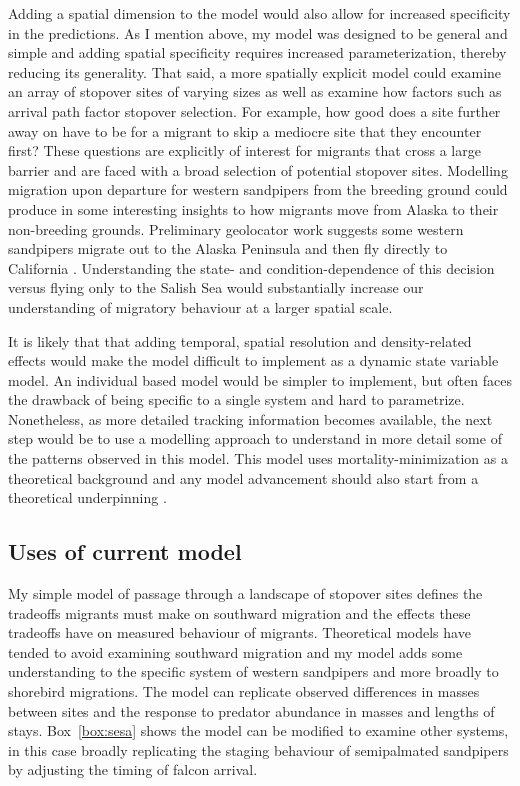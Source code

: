 Adding a spatial dimension to the model would also allow for increased specificity in the predictions. As I mention above, my model was designed to be general and simple and adding spatial specificity requires increased parameterization, thereby reducing its generality. That said, a more spatially explicit model could examine an array of stopover sites of varying sizes as well as examine how factors such as arrival path factor stopover selection. For example, how good does a site further away on have to be for a migrant to skip a mediocre site that they encounter first? These questions are explicitly of interest for migrants that cross a large barrier and are faced with a broad selection of potential stopover sites. Modelling migration upon departure for western sandpipers from the breeding ground could produce in some interesting insights to how migrants move from Alaska to their non-breeding grounds. Preliminary geolocator work suggests some western sandpipers migrate out to the Alaska Peninsula and then fly directly to California \citep{north2016state}. Understanding the state- and condition-dependence of this decision versus flying only to the Salish Sea would substantially increase our understanding of migratory behaviour at a larger spatial scale.

It is likely that that adding temporal, spatial resolution and density-related effects would make the model difficult to implement as a dynamic state variable model. An individual based model would be simpler to implement, but often faces the drawback of being specific to a single system and hard to parametrize. Nonetheless, as more detailed tracking information becomes available, the next step would be to use a modelling approach to understand in more detail some of the patterns observed in this model. This model uses mortality-minimization as a theoretical background and any model advancement should also start from a theoretical underpinning \citep{GrimmVolkerandRailsback2005}.

\subsection*{Uses of current model}


My simple model of passage through a landscape of stopover sites defines the tradeoffs migrants must make on southward migration and the effects these tradeoffs have on measured behaviour of migrants. Theoretical models have tended to avoid examining southward migration and my model adds some understanding to the specific system of western sandpipers and more broadly to shorebird migrations. The model can replicate observed differences in masses between sites and the response to predator abundance in masses and lengths of stays.  Box~\ref{box:sesa} shows the model can be modified to examine other systems, in this case broadly replicating the staging behaviour of semipalmated sandpipers by adjusting the timing of falcon arrival.

